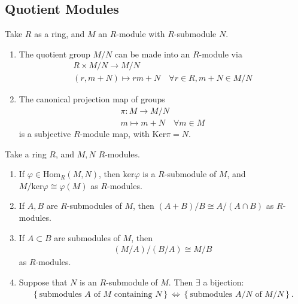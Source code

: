 \documentclass{memoir}
\begin{document}
\subsection{Quotient Modules}
\begin{prop}
	Take \(R\) as a ring, and \(M\) an \(R\)-module with \(R\)-submodule \(N\).
	\begin{enumerate}
		\item The quotient group \(M / N\) can be made into an \(R\)-module via
			\begin{align*}
				R\times M / N \to M / N\\
				(r,m+N) \mapsto rm + N \quad \forall r \in R, m+N \in M / N
			\end{align*}
		\item The canonical projection map of groups
			\begin{align*}
				\pi:M\to M / N\\
				m\mapsto m+N \quad \forall m \in M
			\end{align*}
			is a subjective \(R\)-module map, with \( \textrm{Ker}\pi = N\).
	\end{enumerate}
\end{prop}

\begin{thm}
	Take a ring \(R\), and \(M,N\) \(R\)-modules.
	\begin{enumerate}
		\item If \(\varphi \in \textrm{Hom}_R(M,N)\), then \( \textrm{ker}\varphi\) is a \(R\)-submodule of \(M\), and \(M / \textrm{ker}\varphi \cong \varphi(M)\) as \(R\)-modules.
		\item If \(A,B\) are \(R\)-submodules of \(M\), then \((A+B) / B \cong A / (A\cap B)\) as \(R\)-modules.
		\item If \(A\subset B\) are submodules of \(M\), then
			\begin{align*}
				(M / A) / (B / A) \cong M / B
			\end{align*}
			as \(R\)-modules.
		\item Suppose that \(N\) is an \(R\)-submodule of \(M\). Then \(\exists \) a bijection:
			\begin{align*}
				\left\{ \text{submodules } A \text{ of \(M\) containing \(N\)} \right\} \iff \left\{ \text{submodules \(A / N\) of \(M/N\)} \right\} .
			\end{align*}
	\end{enumerate}
\end{thm}
\end{document}
